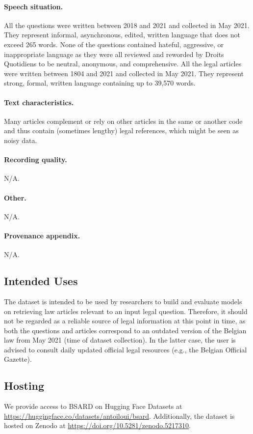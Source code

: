 \documentclass[11pt]{article}
\begin{document}
\paragraph{Speech situation.}
All the questions were written between 2018 and 2021 and collected in May 2021. They represent informal, asynchronous, edited, written language that does not exceed 265 words. None of the questions contained hateful, aggressive, or inappropriate language as they were all reviewed and reworded by Droits Quotidiens to be neutral, anonymous, and comprehensive. All the legal articles were written between 1804 and 2021 and collected in May 2021. They represent strong, formal, written language containing up to 39,570 words.

\paragraph{Text characteristics.}
Many articles complement or rely on other articles in the same or another code and thus contain (sometimes lengthy) legal references, which might be seen as noisy data.

\paragraph{Recording quality.}
N/A.

\paragraph{Other.}
N/A.

\paragraph{Provenance appendix.}
N/A.


\subsection{Intended Uses}
The dataset is intended to be used by researchers to build and evaluate models on retrieving law articles relevant to an input legal question. Therefore, it should not be regarded as a reliable source of legal information at this point in time, as both the questions and articles correspond to an outdated version of the Belgian law from May 2021 (time of dataset collection). In the latter case, the user is advised to consult daily updated official legal resources (e.g., the Belgian Official Gazette).

\subsection{Hosting}
We provide access to BSARD on Hugging Face Datasets \citep{lhoest2021datasets} at {\footnotesize \url{https://huggingface.co/datasets/antoiloui/bsard}}. Additionally, the dataset is hosted on Zenodo at {\footnotesize \url{https://doi.org/10.5281/zenodo.5217310}}.
\end{document}

